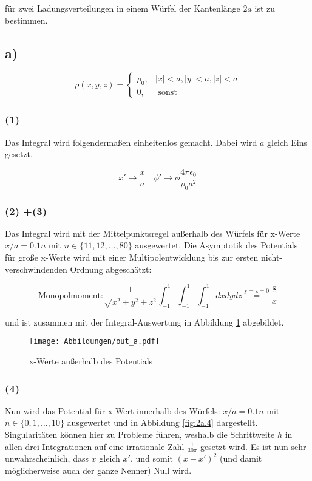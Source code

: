 \noindent
für zwei Ladungsverteilungen in einem Würfel der Kantenlänge $2a$ ist zu bestimmen.


\subsection*{a)}

\begin{equation*}
  \rho(x, y, z)=\left\{\begin{array}{ll}\rho_{0}, & |x|<a,|y|<a,|z|<a \\ 0, & \text { sonst }\end{array}\right.
\end{equation*}


\subsubsection*{(1)}

Das Integral wird folgendermaßen einheitenlos gemacht. Dabei wird $a$ gleich Eins
gesetzt.

\begin{equation*}
  x' \rightarrow \frac{x}{a} \quad
  \phi' \rightarrow \phi\frac{4\pi\epsilon_0}{\rho_0 a^2  }
\end{equation*}

\subsubsection*{(2) +(3)}
Das Integral wird mit der Mittelpunktsregel außerhalb des Würfels für x-Werte
$x / a=0.1 n$ mit $n \in\{11,12, \ldots, 80\}$ ausgewertet. Die Asymptotik des
Potentials für große x-Werte wird mit einer Multipolentwicklung bis zur ersten
nicht-verschwindenden Ordnung abgeschätzt:

\begin{equation*}
	\text{Monopolmoment:}
  \frac{1}{\sqrt{x^2+y^2+z^2}} \int_{-1}^1 \int_{-1}^1 \int_{-1}^1 dxdydz
  \overset{\mathrm{y=z=0}}{=} \frac{8}{x}
\end{equation*}

und ist zusammen mit der Integral-Auswertung in Abbildung \ref{fig:2a.2} abgebildet.

\begin{figure}[H]
    \centering
    \texttt{[image: Abbildungen/out\_a.pdf]}
    \caption{x-Werte außerhalb des Potentials}
    \label{fig:2a.2}
\end{figure}

\subsubsection*{(4)}
Nun wird das Potential für x-Wert innerhalb des Würfels:
$x / a=0.1 n$ mit $n \in\{0,1, \ldots, 10\}$ ausgewertet und in Abbildung \ref{fig:2a.4}
dargestellt. Singularitäten können hier zu Probleme führen, weshalb die Schrittweite $h$
in allen drei Integrationen auf eine irrationale Zahl $\frac{1}{30\pi}$ gesetzt wird.
Es ist nun sehr unwahrscheinlich, dass $x$ gleich $x'$, und somit $(x-x')^2$
(und damit möglicherweise auch der ganze Nenner) Null wird.

